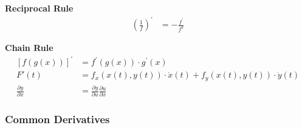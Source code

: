 \textbf{Reciprocal Rule}
\begin{align*}
    {\left(\frac{1}{f}\right)}^{\prime} & = -\frac{f^{\prime}}{f^2}
\end{align*}

\textbf{Chain Rule}
\begin{align*}
    {[f(g(x))]}^{\prime}          & =f^{\prime}(g(x))\cdot g^{\prime}(x)                         \\
    F'(t)                         & =f_x(x(t),y(t))\cdot\dot{x}(t)+f_y(x(t),y(t))\cdot\dot{y}(t) \\
    \frac{\partial y}{\partial x} & = \frac{\partial y}{\partial u}\frac{\partial u}{\partial x}
\end{align*}

\subsubsection{Common Derivatives}
